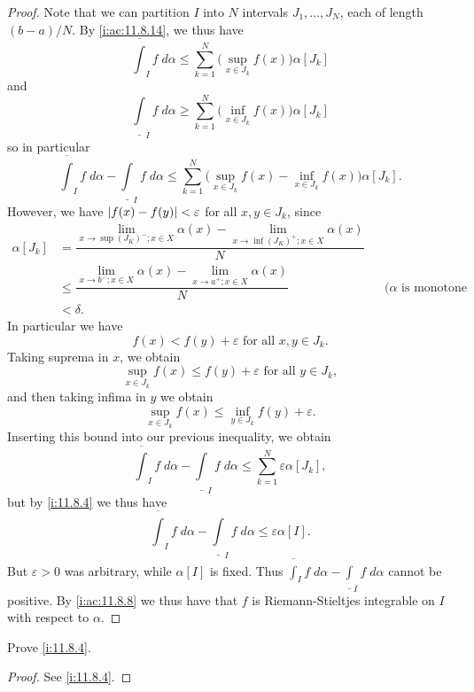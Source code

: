 \begin{proof}
  Note that we can partition \(I\) into \(N\) intervals \(J_1, \dots, J_N\), each of length \((b - a) / N\).
  By \cref{i:ac:11.8.14}, we thus have
  \[
    \overline{\int}_I f \; d \alpha \leq \sum_{k = 1}^N \big(\sup_{x \in J_k} f(x)\big) \alpha[J_k]
  \]
  and
  \[
    \underline{\int}_I f \; d \alpha \geq \sum_{k = 1}^N \big(\inf_{x \in J_k} f(x)\big) \alpha[J_k]
  \]
  so in particular
  \[
    \overline{\int}_I f \; d \alpha - \underline{\int}_I f \; d \alpha \leq \sum_{k = 1}^N \big(\sup_{x \in J_k} f(x) - \inf_{x \in J_k} f(x)\big) \alpha[J_k].
  \]
  However, we have \(\left\lvert f(x) - f(y)\right\rvert < \varepsilon\) for all \(x, y \in J_k\), since
  \begin{align*}
    \alpha[J_k] & = \dfrac{\lim_{x \to \sup(J_K)^- ; x \in X} \alpha(x) - \lim_{x \to \inf(J_K)^+ ; x \in X} \alpha(x)}{N}                                                 \\
                & \leq \dfrac{\lim_{x \to b^- ; x \in X} \alpha(x) - \lim_{x \to a^+ ; x \in X} \alpha(x)}{N}              &  & \text{(\(\alpha\) is monotone increasing)} \\
                & < \delta.
  \end{align*}
  In particular we have
  \[
    f(x) < f(y) + \varepsilon \text{ for all } x, y \in J_k.
  \]
  Taking suprema in \(x\), we obtain
  \[
    \sup_{x \in J_k} f(x) \leq f(y) + \varepsilon \text{ for all } y \in J_k,
  \]
  and then taking infima in \(y\) we obtain
  \[
    \sup_{x \in J_k} f(x) \leq \inf_{y \in J_k} f(y) + \varepsilon.
  \]
  Inserting this bound into our previous inequality, we obtain
  \[
    \overline{\int}_I f \; d \alpha - \underline{\int}_I f \; d \alpha \leq \sum_{k = 1}^N \varepsilon \alpha[J_k],
  \]
  but by \cref{i:11.8.4} we thus have
  \[
    \overline{\int}_I f \; d \alpha - \underline{\int}_I f \; d \alpha \leq \varepsilon \alpha[I].
  \]
  But \(\varepsilon > 0\) was arbitrary, while \(\alpha[I]\) is fixed.
  Thus \(\overline{\int}_I f \; d \alpha - \underline{\int}_I f \; d \alpha\) cannot be positive.
  By \cref{i:ac:11.8.8} we thus have that \(f\) is Riemann-Stieltjes integrable on \(I\) with respect to \(\alpha\).
\end{proof}

\exercisesection

\begin{ex}\label{i:ex:11.8.1}
  Prove \cref{i:11.8.4}.
\end{ex}

\begin{proof}
  See \cref{i:11.8.4}.
\end{proof}

